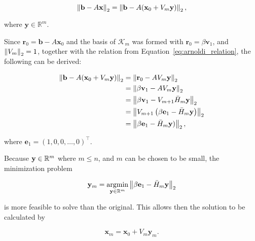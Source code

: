 \begin{equation}
    \left\lVert\mathbf{b} - A\mathbf{x}\right\rVert_2  = \left\lVert\mathbf{b} - A(\mathbf{x}_0 + V_m \mathbf{y})\right\rVert_2,
\end{equation}

where $\mathbf{y} \in \mathbb{R}^m$.

Since $\mathbf{r}_0 = \mathbf{b}-A \mathbf{x}_0$ and the basis of $\mathcal{K}_m$ was formed with $\mathbf{r}_0 = \beta \mathbf{v}_1$, and $\left\lVert V_m\right\rVert_2 = 1$, together with the relation from Equation~\ref{eq:arnoldi_relation}, the following can be derived:

\begin{equation}
    \begin{aligned}
        \left\lVert\mathbf{b} - A(\mathbf{x}_0 + V_m \mathbf{y})\right\rVert_2 & = \left\lVert\mathbf{r}_0 - A V_m \mathbf{y}\right\rVert_2 \\
                                 & = \left\lVert\beta \mathbf{v}_1 - A V_m \mathbf{y}\right\rVert_2 \\
                                 & = \left\lVert\beta \mathbf{v}_1 - V_{m+1}\bar{H}_m \mathbf{y}\right\rVert_2 \\
                                 & = \left\lVert V_{m+1}\left(\beta \mathbf{e}_1 - \bar{H}_m \mathbf{y} \right)\right\rVert_2 \\
                                 & = \left\lVert\beta \mathbf{e}_1 - \bar{H}_m \mathbf{y} )\right\rVert_2,
    \end{aligned}
\end{equation}

where $\mathbf{e}_1 = \left(1, 0, 0, \ldots, 0\right)^\top$.

Because $\mathbf{y} \in \mathbb{R}^m$ where $m \leq n$, and $m$ can be chosen to be small, the minimization problem 

\begin{equation}
    \mathbf{y}_m  = \operatorname*{argmin}_{\mathbf{y} \in \mathbb{R}^m} \left\lVert\beta \mathbf{e}_1 - \bar{H}_m \mathbf{y}\right\rVert_2
\end{equation}

is more feasible to solve than the original. This allows then the solution to be calculated by

\begin{equation}
    \mathbf{x}_m = \mathbf{x}_0 + V_m \mathbf{y}_m.
\end{equation}

